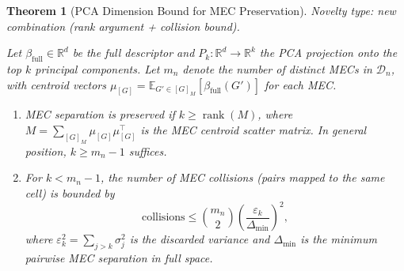 \documentclass{article}
\theoremstyle{definition}
\theoremstyle{plain}
\newtheorem{theorem}{Theorem}
\theoremstyle{remark}
\DeclareMathOperator{\rank}{rank}
\begin{document}
\begin{theorem}[PCA Dimension Bound for MEC Preservation]
\label{thm:pca}
\emph{Novelty type: new combination (rank argument + collision bound).}

Let $\beta_{\mathrm{full}} \in \mathbb{R}^d$ be the full descriptor and
$P_k : \mathbb{R}^d \to \mathbb{R}^k$ the PCA projection onto the top $k$
principal components. Let $m_n$ denote the number of distinct MECs in
$\mathcal{D}_n$, with centroid vectors
$\mu_{[G]} = \mathbb{E}_{G' \in [G]_M}[\beta_{\mathrm{full}}(G')]$ for each MEC.

\begin{enumerate}
  \item[(a)] MEC separation is preserved if
    $k \geq \rank(M)$, where $M = \sum_{[G]_M} \mu_{[G]}\mu_{[G]}^\top$ is the
    MEC centroid scatter matrix. In general position, $k \geq m_n - 1$ suffices.
  \item[(b)] For $k < m_n - 1$, the number of MEC collisions (pairs mapped to
    the same cell) is bounded by
    \begin{equation}
      \label{eq:collisions}
      \mathrm{collisions} \leq \binom{m_n}{2}
        \left(\frac{\varepsilon_k}{\Delta_{\min}}\right)^{\!2},
    \end{equation}
    where $\varepsilon_k^2 = \sum_{j>k}\sigma_j^2$ is the discarded variance
    and $\Delta_{\min}$ is the minimum pairwise MEC separation in full space.
\end{enumerate}
\end{theorem}
\end{document}
